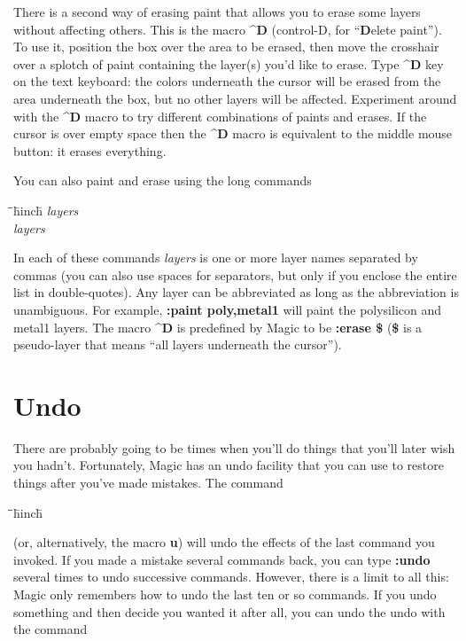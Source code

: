 \documentclass[letterpaper,twoside,12pt]{article}
\def\hinch{\hspace*{0.5in}}
\def\starti{\begin{center}\begin{tabbing}\hinch\=\hinch\=\hinch\=hinch\=\kill}
\def\endi{\end{tabbing}\end{center}}
\def\ii{\>\>\>}
\begin{document}
There is a second way of erasing paint that allows you to
erase some layers without affecting others.  This is the
macro {\bfseries \^{}D} (control-D, for ``{\bfseries D}elete paint'').  To use it,
position the box over the area to be erased, then move
the crosshair over a splotch of paint containing the
layer(s) you'd like to erase.  Type {\bfseries \^{}D} key on
the text keyboard: the colors underneath the cursor will
be erased from the area underneath the box, but no other
layers will be affected.  Experiment around with the {\bfseries \^{}D}
macro to try different combinations of paints and erases.
If the cursor is over empty space then the {\bfseries \^{}D}
macro is equivalent to the middle mouse button:  it erases
everything.

You can also paint and erase using the long commands

\starti
   \ii {\bfseries :paint} {\itshape layers} \\
   \ii {\bfseries :erase} {\itshape layers}
\endi

In each of these commands {\itshape layers} is one or more layer
names separated by commas (you can also use spaces for separators,
but only if you enclose the entire list in double-quotes).  Any
layer can be abbreviated as long as the abbreviation is
unambiguous.  For example, {\bfseries :paint poly,metal1} will
paint the polysilicon and metal1 layers.  The macro {\bfseries \^{}D}
is predefined by Magic to be {\bfseries :erase \$} ({\bfseries \$} is a
pseudo-layer that means ``all layers underneath the cursor'').

\section{Undo}

There are probably going to be times when you'll do things that
you'll later wish you hadn't.  Fortunately, Magic has an
undo facility that you can use to restore things after you've
made mistakes.  The command

\starti
   \ii {\bfseries :undo}
\endi

(or, alternatively, the macro {\bfseries u}) will undo the effects of
the last command you invoked.
If you made a mistake several commands back, you can type
{\bfseries :undo} several times to undo successive commands.
However, there is a limit to all this:  Magic only remembers
how to undo the last ten or so commands.  If you
undo something and then decide you wanted it after all, you
can undo the undo with the command
\end{document}
